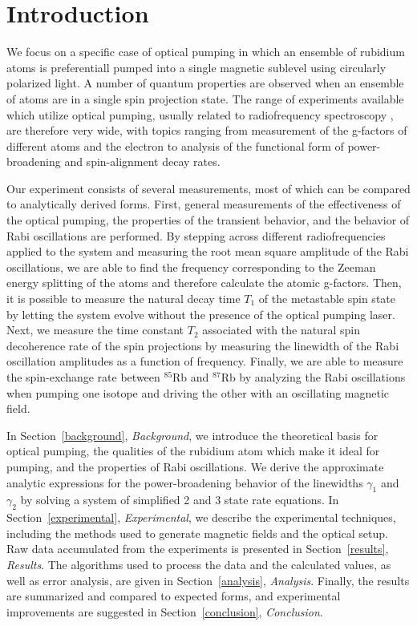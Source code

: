 
\section{Introduction}\label{introduction}

We focus on a specific case of optical pumping in which an ensemble of rubidium atoms is preferentiall pumped into a single magnetic sublevel using circularly polarized light. A number of quantum properties are observed when an ensemble of atoms are in a single spin projection state. The range of experiments available which utilize optical pumping, usually related to radiofrequency spectroscopy \cite{bloom}, are therefore very wide, with topics ranging from measurement of the g-factors of different atoms and the electron to analysis of the functional form of power-broadening and spin-alignment decay rates.

Our experiment consists of several measurements, most of which can be compared to analytically derived forms. First, general measurements of the effectiveness of the optical pumping, the properties of the transient behavior, and the behavior of Rabi oscillations are performed. By stepping across different radiofrequencies applied to the system and measuring the root mean square amplitude of the Rabi oscillations, we are able to find the frequency corresponding to the Zeeman energy splitting of the atoms and therefore calculate the atomic g-factors. Then, it is possible to measure the natural decay time $T_{1}$ of the metastable spin state by letting the system evolve without the presence of the optical pumping laser. Next, we measure the time constant $T_{2}$ associated with the natural spin decoherence rate of the spin projections by measuring the linewidth of the Rabi oscillation amplitudes as a function of frequency. Finally, we are able to measure the spin-exchange rate between $^{85}$Rb and $^{87}$Rb by analyzing the Rabi oscillations when pumping one isotope and driving the other with an oscillating magnetic field.

In Section~\ref{background}, \emph{Background}, we introduce the theoretical basis for optical pumping, the qualities of the rubidium atom which make it ideal for pumping, and the properties of Rabi oscillations. We derive the approximate analytic expressions for the power-broadening behavior of the linewidths $\gamma_{1}$ and $\gamma_{2}$ by solving a system of simplified 2 and 3 state rate equations. In Section~\ref{experimental}, \emph{Experimental}, we describe the experimental techniques, including the methods used to generate magnetic fields and the optical setup. Raw data accumulated from the experiments is presented in Section~\ref{results}, \emph{Results}. The algorithms used to process the data and the calculated values, as well as error analysis, are given in Section~\ref{analysis}, \emph{Analysis}. Finally, the results are summarized and compared to expected forms, and experimental improvements are suggested in Section~\ref{conclusion}, \emph{Conclusion}.